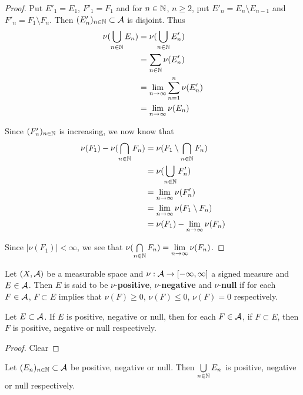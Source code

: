 \documentclass{book}
\begin{document}
	\begin{proof}
		Put $E'_1 = E_1$, $F'_1 = F_1$ and for $n \in \mathbb{N}$, $n \geq 2$, put $E'_n = E_n \setminus E_{n-1}$ and $F'_n = F_1 \setminus F_n$. Then $(E'_n)_{n \in \mathbb{N}} \subset \mathcal{A}$ is disjoint. Thus 
		\begin{align*}
			\nu(\bigcup\limits_{n \in \mathbb{N}} E_n) 
			&= \nu(\bigcup\limits_{n \in \mathbb{N}} E'_n)\\
			&= \sum\limits_{n \in \mathbb{N}} \nu(E'_n)\\
			&= \lim \limits_{n \rightarrow \infty} \sum\limits_{n=1}^n \nu(E'_n)\\
			&= \lim \limits_{n \rightarrow \infty} \nu(E_n)
		\end{align*}
		
		Since $(F'_n)_{n \in \mathbb{N}}$ is increasing, we now know that 
		\begin{align*}
			\nu(F_1) - \nu(\bigcap\limits_{n \in \mathbb{N}} F_n)
			&= \nu(F_1 \setminus \bigcap\limits_{n \in \mathbb{N}} F_n)\\
			&= \nu(\bigcup\limits_{n \in \mathbb{N}} F'_n) \\
			&= \lim \limits_{n \rightarrow \infty} \nu(F'_n) \\
			&= \lim \limits_{n \rightarrow \infty} \nu(F_1 \setminus F_n) \\ 
			&= \nu(F_1) - \lim \limits_{n \rightarrow \infty} \nu(F_n)
		\end{align*}
		
		Since $|\nu(F_1)| < \infty$, we see that $\nu(\bigcap\limits_{n \in \mathbb{N}} F_n) = \lim \limits_{n \rightarrow \infty} \nu(F_n)$.
	\end{proof}
	
	\begin{defn}  
		Let $(X, \mathcal{A})$ be a measurable space and $\nu: \mathcal{A} \rightarrow [-\infty, \infty]$ a signed measure and $E \in \mathcal{A}$. Then $E$ is said to be $\nu$-\textbf{positive}, $\nu$-\textbf{negative} and $\nu$-\textbf{null} if for each $F \in \mathcal{A}$, $F \subset E$ implies that $\nu(F) \geq 0$, $\nu(F) \leq 0$, $\nu(F) = 0$ respectively.
	\end{defn}
	
	\begin{ex}  
		Let $E \subset \mathcal{A}$. If $E$ is positive, negative or null, then for each $F \in \mathcal{A}$, if $F \subset E$, then $F$ is positive, negative or null respectively.
	\end{ex}
	
	\begin{proof}
		Clear
	\end{proof}
	
	\begin{ex}  
		Let $(E_n)_{n \in \mathbb{N}} \subset \mathcal{A}$ be positive, negative or null. Then $\bigcup\limits_{n \in \mathbb{N}} E_n$ is positive, negative or null respectively. 
	\end{ex}
	
\end{document}
